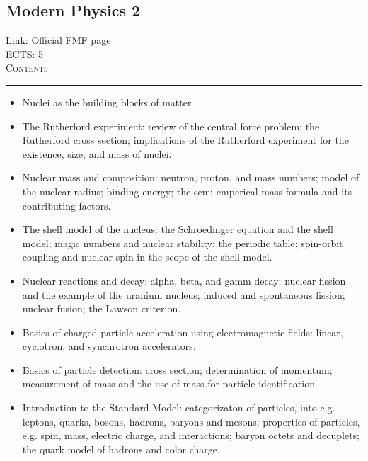 \documentclass[11pt, a4paper]{article}
\newenvironment{course}[3]{
\subsection{#1}%
Link: \href{#2}{Official FMF page}\\%
ECTS: #3%
\vspace{1ex}
\\
{\large \textsc{Contents}}\\[-0.9ex]%
\rule{\textwidth}{0.5pt}
\vspace{-3ex}
}
{}
\newenvironment{chapter}[1]{
\begin{tcolorbox}[title=#1, breakable]
}
{\end{tcolorbox}}
\begin{document}
\begin{course}{Modern Physics 2}{https://www.fmf.uni-lj.si/en/study-physics/programmes/1fiz/2020/7000777/courses/1162/}{5}
\begin{chapter}{Introduction to solid state physics}
    \end{chapter}

    \begin{chapter}{Introduction to nuclear physics}
        \begin{itemize}
        
            \item Nuclei as the building blocks of matter

            \item The Rutherford experiment: review of the central force problem; the Rutherford cross section; implications of the Rutherford experiment for the existence, size, and mass of nuclei.

            \item Nuclear mass and composition: neutron, proton, and mass numbers; model of the nuclear radius; binding energy; the semi-emperical mass formula and its contributing factors.

            \item The shell model of the nucleus: the Schroedinger equation and the shell model; magic numbers and nuclear stability; the periodic table; spin-orbit coupling and nuclear spin in the scope of the shell model.

            \item Nuclear reactions and decay: alpha, beta, and gamm decay; nuclear fission and the example of the uranium nucleus; induced and spontaneous fission; nuclear fusion; the Lawson criterion.
        
        \end{itemize}
    \end{chapter}

    \begin{chapter}{Introduction to particle physics}
        \begin{itemize}
        
            \item Basics of charged particle acceleration using electromagnetic fields: linear, cyclotron, and synchrotron accelerators.

            \item Basics of particle detection: cross section; determination of momentum; measurement of mass and the use of mass for particle identification.

            \item Introduction to the Standard Model: categorizaton of particles, into e.g. leptons, quarks, bosons, hadrons, baryons and mesons; properties of particles, e.g. spin, mass, electric charge, and interactions; baryon octets and decuplets; the quark model of hadrons and color charge.


\end{itemize}
\end{chapter}
\end{course}
\end{document}

